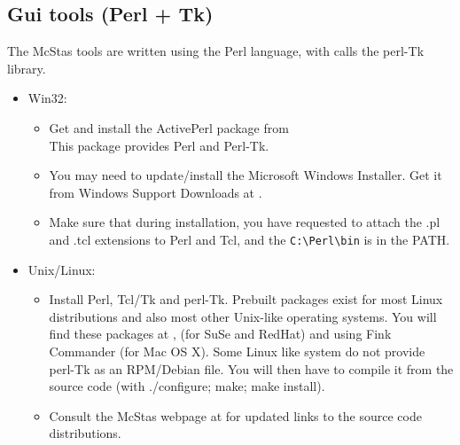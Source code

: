 \subsection{Gui tools (Perl + Tk)}
\label{s:perltk}

The McStas tools are written using the Perl language, with calls the perl-Tk library.

\begin{itemize}
\item{Win32:}
  \begin{itemize}
  \item{Get and install the ActivePerl package from\\
      This package provides Perl and Perl-Tk.}
  \item{You may need to update/install the Microsoft Windows Installer. Get it from Windows Support Downloads at .}
  \item{Make sure that during installation, you have requested to attach the .pl and .tcl extensions to Perl and Tcl, and the \verb+C:\Perl\bin+ is in the PATH.}
  \end{itemize}
\item{Unix/Linux:}
  \begin{itemize}
    \item{Install Perl, Tcl/Tk and perl-Tk. Prebuilt packages exist for
      most Linux distributions and also most other Unix-like operating
      systems. You will find these packages at ,  (for SuSe and RedHat) and using Fink Commander (for Mac OS X). Some Linux like system do not provide perl-Tk as an RPM/Debian file. You will then have to compile it from the source code (with ./configure; make; make install).}
    \item{Consult the McStas webpage at  for updated links to the source code distributions.}
    \end{itemize}
  \end{itemize}

